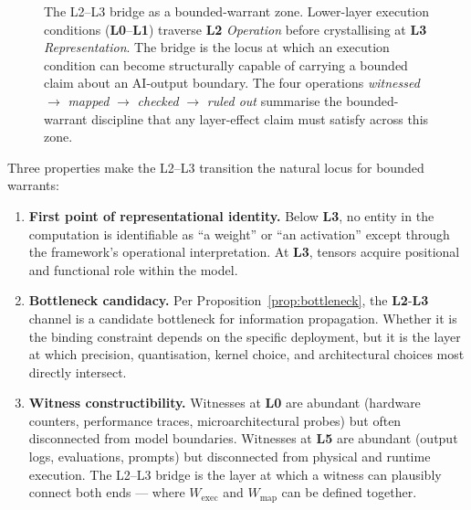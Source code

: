 \documentclass[11pt, a4paper]{article}
\theoremstyle{upldef}
\newcommand{\witness}[1]{\ensuremath{W_{\text{#1}}}}
\newcommand{\layer}[1]{\textbf{L#1}}
\begin{document}
\begin{figure}[!t]
{%
}
\caption{The L2--L3 bridge as a bounded-warrant zone. Lower-layer
execution conditions (\layer{0}--\layer{1}) traverse \layer{2}
\emph{Operation} before crystallising at \layer{3}
\emph{Representation}. The bridge is the locus at which an execution
condition can become structurally capable of carrying a bounded
claim about an AI-output boundary. The four operations
\emph{witnessed} $\to$ \emph{mapped} $\to$ \emph{checked} $\to$
\emph{ruled out} summarise the bounded-warrant discipline that any
layer-effect claim must satisfy across this zone.}
\label{fig:bridge}
\end{figure}

Three properties make the L2--L3 transition the natural locus for
bounded warrants:

\begin{enumerate}
\item \textbf{First point of representational identity.}
Below \layer{3}, no entity in the computation is identifiable as
``a weight'' or ``an activation'' except through the framework's
operational interpretation. At \layer{3}, tensors acquire positional
and functional role within the model.
\item \textbf{Bottleneck candidacy.} Per
Proposition~\ref{prop:bottleneck}, the \layer{2}-\layer{3} channel
is a candidate bottleneck for information propagation. Whether it
is the binding constraint depends on the specific deployment, but
it is the layer at which precision, quantisation, kernel choice,
and architectural choices most directly intersect.
\item \textbf{Witness constructibility.} Witnesses at \layer{0} are
abundant (hardware counters, performance traces, microarchitectural
probes) but often disconnected from model boundaries. Witnesses at
\layer{5} are abundant (output logs, evaluations, prompts) but
disconnected from physical and runtime execution. The L2--L3 bridge
is the layer at which a witness can plausibly connect both ends ---
where $\witness{exec}$ and $\witness{map}$ can be defined together.
\end{enumerate}
\end{document}
